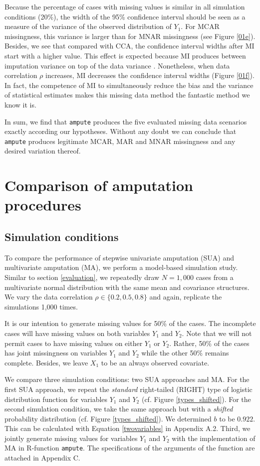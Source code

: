 \documentclass[]{interact}
\newcommand{\code}[1]{\texttt{#1}}
\begin{document}
Because the percentage of cases with missing values is similar in all simulation conditions (20\%), the width of the 95\% confidence interval should be seen as a measure of the variance of the observed distribution of $Y_1$. For MCAR missingness, this variance is larger than for MNAR missingness (see Figure \ref{01e}). Besides, we see that compared with CCA, the confidence interval widths after MI start with a higher value. This effect is expected because MI produces between imputation variance on top of the data variance \citep{Rubin1987}. Nonetheless, when data correlation $\rho$ increases, MI decreases the confidence interval widths (Figure \ref{01f}). In fact, the competence of MI to simultaneously reduce the bias and the variance of statistical estimates makes this missing data method the fantastic method we know it is. 

In sum, we find that \code{ampute} produces the five evaluated missing data scenarios exactly according our hypotheses. Without any doubt we can conclude that \code{ampute} produces legitimate MCAR, MAR and  MNAR missingness and any desired variation thereof. 

\section{Comparison of amputation procedures}\label{compare}

\subsection{\normalsize Simulation conditions}

To compare the performance of stepwise univariate amputation (SUA) and multivariate amputation (MA), we perform a model-based simulation study. Similar to section \ref{evaluation}, we repeatedly draw $N = 1,000$ cases from a multivariate normal distribution with the same mean and covariance structures. We vary the data correlation $\rho \in \{0.2, 0.5, 0.8\}$ and again, replicate the simulations 1,000 times. 

It is our intention to generate missing values for 50\% of the cases. The incomplete cases will have missing values on both variables $Y_1$ and $Y_2$. Note that we will not permit cases to have missing values on either $Y_1$ or $Y_2$. Rather, 50\% of the cases has joint missingness on variables $Y_1$ and $Y_2$ while the other 50\% remains complete. Besides, we leave $X_1$ to be an always observed covariate.

We compare three simulation conditions: two SUA approaches and MA. For the first SUA approach, we repeat the \textit{standard} right-tailed (RIGHT) type of logistic distribution function for variables $Y_1$ and $Y_2$ (cf. Figure \ref{types_shifted}). For the second simulation condition, we take the same approach but with a \textit{shifted} probability distribution (cf. Figure \ref{types_shifted}). We determined $b$ to be $0.922$. This can be calculated with Equation \eqref{twovariables} in Appendix A.2. Third, we jointly generate missing values for variables $Y_1$ and $Y_2$ with the implementation of MA in R-function \code{ampute}. The specifications of the arguments of the function are attached in Appendix C.
\end{document}

